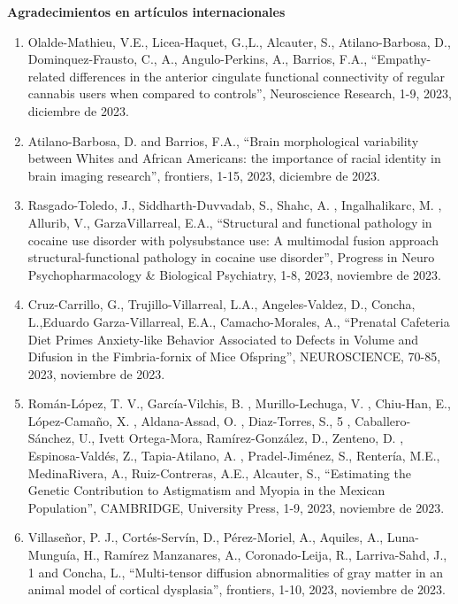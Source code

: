 \textbf{Agradecimientos en artículos internacionales}

\begin{enumerate}
\item Olalde-Mathieu, V.E., Licea-Haquet, G.,L., Alcauter, S., Atilano-Barbosa, D., Dominquez-Frausto, C., A., Angulo-Perkins, A., Barrios, F.A., 
“Empathy-related 
differences in the anterior cingulate functional connectivity of regular cannabis users when compared to controls”, Neuroscience Research, 1-9, 2023,  
diciembre de 2023.

\item Atilano-Barbosa, D. and Barrios, F.A., “Brain morphological variability between Whites and African Americans: the importance of racial identity in brain 
imaging research”, frontiers, 1-15, 2023,  diciembre de 2023.

\item Rasgado-Toledo, J., Siddharth-Duvvadab, S., Shahc, A. , Ingalhalikarc, M. , Allurib, V., GarzaVillarreal, E.A., “Structural and functional pathology in 
cocaine use disorder with polysubstance use: A multimodal fusion approach structural-functional pathology in cocaine use disorder”, Progress in Neuro 
Psychopharmacology \& Biological Psychiatry, 1-8, 2023,  noviembre de 2023.

\item Cruz-Carrillo, G., Trujillo-Villarreal, L.A., Angeles-Valdez, D., Concha, L.,Eduardo Garza-Villarreal, E.A., Camacho-Morales, A., “Prenatal Cafeteria Diet 
Primes Anxiety-like Behavior Associated to Defects in Volume and Difusion in the Fimbria-fornix of Mice Ofspring”, NEUROSCIENCE, 70-85, 2023,  noviembre de 
2023.

\item Román-López, T. V., García-Vilchis, B. , Murillo-Lechuga, V. , Chiu-Han, E., López-Camaño, X. , Aldana-Assad, O. , Diaz-Torres, S., 5 , Caballero-Sánchez, 
U., Ivett Ortega-Mora, Ramírez-González, D., Zenteno, D. , Espinosa-Valdés, Z., Tapia-Atilano, A. , Pradel-Jiménez, S., Rentería, M.E., MedinaRivera, A., 
Ruiz-Contreras, A.E., Alcauter, S., “Estimating the Genetic Contribution to Astigmatism and Myopia in the Mexican Population”, CAMBRIDGE, University Press, 
1-9, 2023,  noviembre de 2023.

\item Villaseñor, P. J., Cortés-Servín, D., Pérez-Moriel, A., Aquiles, A., Luna-Munguía, H., Ramírez Manzanares, A., Coronado-Leija, R., Larriva-Sahd, J., 1 and 
Concha, L., “Multi-tensor diffusion abnormalities of gray matter in an animal model of cortical dysplasia”, frontiers, 1-10, 2023,  noviembre de 2023.


\end{enumerate}
